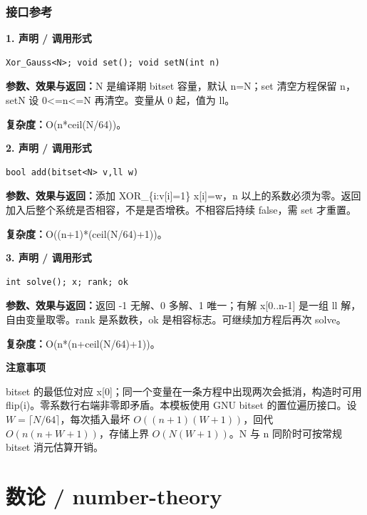 \documentclass[UTF8,a4paper,10pt]{ctexart}
\newcommand{\TemplNote}[1]{\textbf{注意事项}\par #1\par}
\begin{document}
\subsubsection*{接口参考}
\noindent\begin{minipage}{\textwidth}
\textbf{1. 声明 / 调用形式}
\begin{lstlisting}
Xor_Gauss<N>; void set(); void setN(int n)
\end{lstlisting}
\textbf{参数、效果与返回：}N 是编译期 bitset 容量，默认 n=N；set 清空方程保留 n，setN 设 0<=n<=N 再清空。变量从 0 起，值为 ll。

\textbf{复杂度：}O(n*ceil(N/64))。

\end{minipage}\par\vspace{0.4em}
\noindent\begin{minipage}{\textwidth}
\textbf{2. 声明 / 调用形式}
\begin{lstlisting}
bool add(bitset<N> v,ll w)
\end{lstlisting}
\textbf{参数、效果与返回：}添加 XOR\_\{i:v[i]=1\} x[i]=w，n 以上的系数必须为零。返回加入后整个系统是否相容，不是是否增秩。不相容后持续 false，需 set 才重置。

\textbf{复杂度：}O((n+1)*(ceil(N/64)+1))。

\end{minipage}\par\vspace{0.4em}
\noindent\begin{minipage}{\textwidth}
\textbf{3. 声明 / 调用形式}
\begin{lstlisting}
int solve(); x; rank; ok
\end{lstlisting}
\textbf{参数、效果与返回：}返回 -1 无解、0 多解、1 唯一；有解 x[0..n-1] 是一组 ll 解，自由变量取零。rank 是系数秩，ok 是相容标志。可继续加方程后再次 solve。

\textbf{复杂度：}O(n*(n+ceil(N/64)+1))。

\TemplNote{bitset 的最低位对应 x[0]；同一个变量在一条方程中出现两次会抵消，构造时可用 flip(i)。零系数行右端非零即矛盾。本模板使用 GNU bitset 的置位遍历接口。设 $W=\lceil N/64\rceil$，每次插入最坏 $O((n+1)(W+1))$，回代 $O(n(n+W+1))$，存储上界 $O(N(W+1))$。N 与 n 同阶时可按常规 bitset 消元估算开销。}
\end{minipage}\par\vspace{0.4em}
\clearpage
\section{数论 / number-theory}
\end{document}
